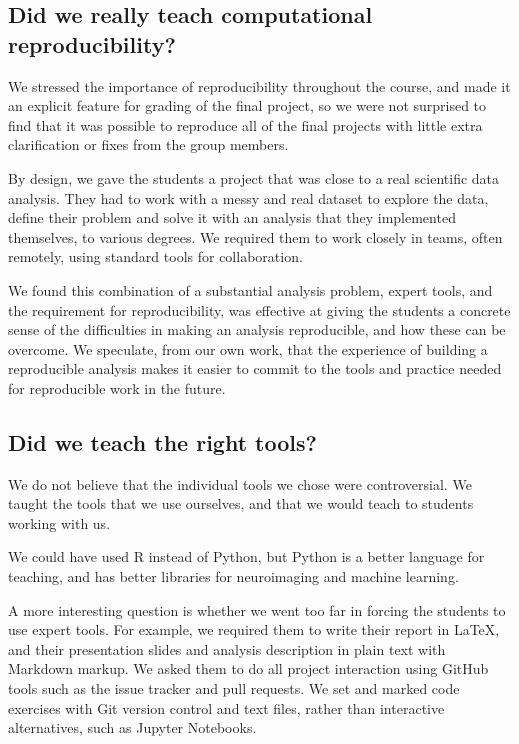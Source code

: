 \subsection{Did we really teach computational reproducibility?}

We stressed the importance of reproducibility throughout the course, and
made it an explicit feature for grading of the final project, so we were not
surprised to find that it was possible to reproduce all of the final projects
with little extra clarification or fixes from the group members.

By design, we gave the students a project that was close to a real
scientific data analysis.  They had to work with a messy and real dataset to
explore the data, define their problem and solve it with an analysis that they
implemented themselves, to various degrees.  We required them to work closely
in teams, often remotely, using standard tools for collaboration.

We found this combination of a substantial analysis problem, expert tools, and
the requirement for reproducibility, was effective at giving the students a
concrete sense of the difficulties in making an analysis reproducible, and how
these can be overcome.  We speculate, from our own work, that the
experience of building a reproducible analysis makes it easier to commit to
the tools and practice needed for reproducible work in the future.

\subsection{Did we teach the right tools?}

We do not believe that the individual tools we chose were controversial. We
taught the tools that we use ourselves, and that we would teach to
students working with us.

We could have used R instead of Python, but Python is a better language for
teaching, and has better libraries for neuroimaging and machine learning.

A more interesting question is whether we went too far in forcing the students
to use expert tools.  For example, we required them to write their
report in \LaTeX, and their presentation slides and analysis description in
plain text with Markdown markup.  We asked them to do all project interaction
using GitHub tools such as the issue tracker and pull requests.  We set and
marked code exercises with Git version control and text files, rather than
interactive alternatives, such as Jupyter Notebooks.

